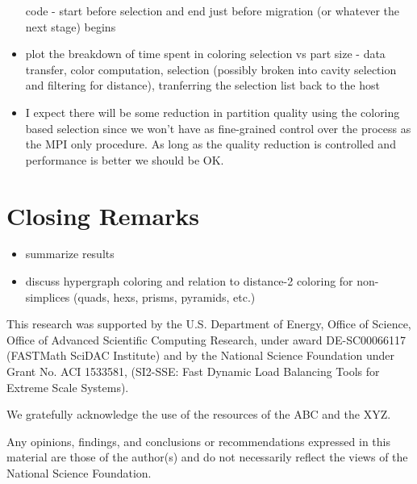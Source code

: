 \documentclass[graybox]{svmult}
\begin{document}
\begin{itemize}
    code - start before selection and end just before migration (or whatever the
    next stage) begins
  \item plot the breakdown of time spent in coloring selection vs part size -
    data transfer, color computation, selection (possibly broken into cavity
    selection and filtering for distance), tranferring the selection list
    back to the host
  \item I expect there will be some reduction in partition quality using the
    coloring based selection since we won't have as fine-grained control over
    the process as the MPI only procedure.  As long as the quality reduction is
    controlled and performance is better we should be OK.
\end{itemize}

\section{Closing Remarks} \label{sec:closing}
\begin{itemize}
  \item summarize results
  \item discuss hypergraph coloring and relation to distance-2 coloring for non-simplices (quads, hexs, prisms, pyramids, etc.)
\end{itemize}

\begin{acknowledgement}
This research was supported by the U.S. Department of Energy, Office of Science,
Office of Advanced Scientific Computing Research, under award DE-SC00066117
(FASTMath SciDAC Institute) and by the National Science Foundation under Grant
No. ACI 1533581, (SI2-SSE: Fast Dynamic Load Balancing Tools for Extreme Scale
Systems).

We gratefully acknowledge the use of the resources of the ABC and the XYZ.

Any opinions, findings, and conclusions or recommendations expressed in this
material are those of the author(s) and do not necessarily reflect the views
of the National Science Foundation.
\end{acknowledgement}



\end{document}
